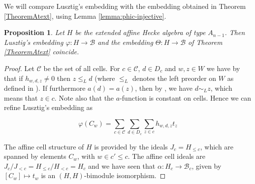 \documentclass[oneside, a4paper, 11pt]{amsart}
\newcommand{\cB}{\mathcal{B}}
\newcommand{\cC}{\mathcal{C}}
\newtheorem{proposition}[theorem]{Proposition}
\begin{document}
We will compare Lusztig's embedding with the embedding
obtained in Theorem \ref{TheoremAtext}, using Lemma
\ref{lemma:phic-injective}.

\begin{proposition} \label{embeddingscoincide}
  Let $H$ be the extended affine Hecke algebra of type $A_{n-1}$. Then Lusztig's embedding $\varphi:H\to \cB$ and the embedding $\Theta:H\to \cB$ of Theorem \ref{TheoremAtext} coincide.
\end{proposition}
\begin{proof}
Let $\cC$ be the set of all cells. For $c\in \cC$, $d\in D_c$  and  $w,z\in W$ we have by \cite[p.540]{Lusztig2} that  if $h_{w,d,z}\neq 0$ then $z\leq_L d$ (where $\leq_L$ denotes the left preorder on $W$ as defined in \cite{KazhdanLusztig}). If furthermore $a(d)=a(z)$, then by \cite[2.3.2]{GeckJacon}, we have $d\sim_L z$, which means that $z\in c$. Note also that the $a$-function is constant on cells. Hence we can refine Lusztig's embedding as

\begin{equation}\label{eq:littlePhi}
\varphi(C_w) = \sum_{c\in \cC}  \sum_{d\in D_c} \sum_{z\in c} h_{w,d,z} t_z
\end{equation}

The affine cell structure of $H$ is provided by the ideals $J_c = H_{\leq c}$, which are spanned by elements $C_w$, with $w\in c'\leq c$. The affine cell ideals are $J_c/J_{<c} =  H_{\leq c}/H_{< c} = H_c$ and we have seen that $\alpha : H_c \to \cB_c$, given by $[C_w] \mapsto t_w$ is an $(H,H)$-bimodule isomorphism. 


\end{proof}
\end{document}
